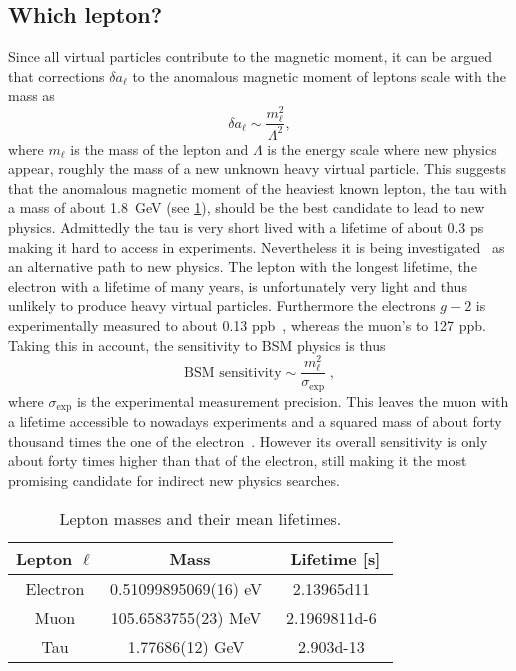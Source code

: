 \subsection{Which lepton?}

Since all virtual particles contribute to the magnetic moment, it can be argued~\cite{osti_4382322} that corrections $\delta a_{\ell}$ to the anomalous magnetic moment of leptons scale with the mass as
\begin{equation}
\delta a_{\ell} \sim \frac{m_{\ell}^{2}}{\Lambda^{2}},
\end{equation}
where $m_{\ell}$ is the mass of the lepton and $\Lambda$ is the energy scale where new physics appear, \ie roughly the mass of a new unknown heavy virtual particle.
This suggests that the anomalous magnetic moment of the heaviest known lepton, the tau with a mass of about \SI{1.8}{\GeV} (see \cref{tab:leptons}), should be the best candidate to lead to new physics.
Admittedly the tau is very short lived with a lifetime of about \num{0.3} ps making it hard to access in experiments.
Nevertheless it is being investigated~\cite{Fael:2013ij,BaBar:2015ard} as an alternative path to new physics.
The lepton with the longest lifetime, the electron with a lifetime of many years, is unfortunately very light and thus unlikely to produce heavy virtual particles.
Furthermore the electrons $g-2$ is experimentally measured to about \num{0.13} ppb~\cite{Fan:2022eto}, whereas the muon's to \num{127} ppb\cite{Muong-2:2025xyk}.
Taking this in account, the sensitivity to BSM physics is thus
\begin{equation}
\text{BSM sensitivity} \sim \frac{m_{\ell}^{2}}{\sigma_{\text{exp}}} \;,
\end{equation}
where $\sigma_{\text{exp}}$ is the experimental measurement precision.
This leaves the muon with a lifetime accessible to nowadays experiments and a squared mass of about forty thousand times the one of the electron~\cite{jegerlehner2009muon}.
However its overall sensitivity is only about forty times higher than that of the electron, still making it the most promising candidate for indirect new physics searches.

\begin{table}
\begin{tabular}{ccc}
\toprule
Lepton $\ell$ & Mass & Lifetime [s] \\
\midrule
Electron &
0.51099895069(16) eV~\cite{codata:2022} &
\num{2.13965d11}~\cite{PhysRevLett.115.231802} \\
\midrule
Muon &
105.6583755(23) MeV~\cite{codata:2022} &
\num{2.1969811d-6}~\cite{beringer2012pdg,Patrignani_2016} \\
\midrule
Tau &
1.77686(12) GeV~\cite{codata:2022,PhysRevD.98.030001} &
\num{2.903d-13}~\cite{PhysRevD.98.030001} \\
\bottomrule
\end{tabular}
\caption{\label{tab:leptons}
Lepton masses and their mean lifetimes.}
\end{table}

